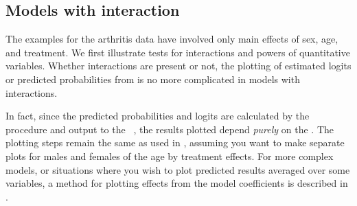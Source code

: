 \subsection{Models with interaction}\label{sec:logist-multint}
The examples for the arthritis data have involved only main effects
of sex, age, and treatment.  We first illustrate tests for interactions
and powers of quantitative variables.
Whether interactions are present or not, the plotting of
estimated logits or predicted probabilities from  is no
more complicated in models with interactions.

In fact, since the predicted probabilities and logits are calculated
by the procedure and output to the \Dset\ , the results
plotted depend \emph{purely} on the .  The plotting
steps remain the same as used in , 
assuming you want to make separate plots for
males and females of the age by treatment effects.
For more complex models, or situations where you wish to plot predicted
results averaged over some variables, a method for plotting effects from
the model coefficients is described in .

